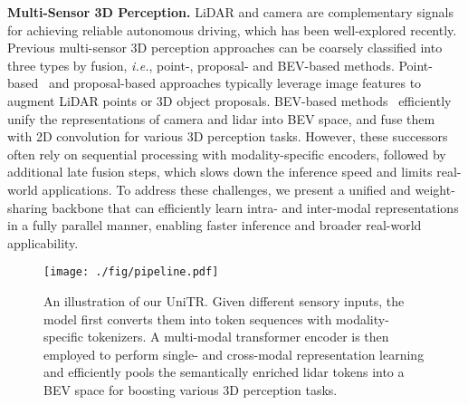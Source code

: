 \documentclass[10pt,twocolumn,letterpaper]{article}
\begin{document}
\noindent \textbf{Multi-Sensor 3D Perception.} LiDAR and camera are complementary signals for achieving reliable autonomous driving, which has been well-explored recently. Previous multi-sensor 3D perception approaches can be coarsely classified into three types by fusion, \emph{i.e.}, point-, proposal- and BEV-based methods. Point-based~\cite{sindagi2019mvx,vora2020pointpainting,huang2020epnet,yin2021cvpr,wang2021pointaugmenting,wu2023virtual} and proposal-based approaches\cite{chen2017multi,yoo20203d,bai2022transfusion,li2022deepfusion,yang2022boosting,wang2023mvcontrast,lu2023cross} typically leverage image features to augment LiDAR points or 3D object proposals. BEV-based methods~\cite{liu2022bevfusion,liang2022bevfusion,gao2023sparse} efficiently unify the representations of camera and lidar into BEV space, and fuse them with 2D convolution for various 3D perception tasks. However, these successors often rely on sequential processing with modality-specific encoders, followed by additional late fusion steps,  which slows down the inference speed and limits real-world applications. To address these challenges, we present a unified and weight-sharing backbone that can efficiently learn intra- and inter-modal representations in a fully parallel manner, enabling faster inference and broader real-world applicability.

\begin{figure*}[t]
\begin{center}
\vspace{-10pt}
\texttt{[image: ./fig/pipeline.pdf]}
\end{center}
   \vspace{-12pt}
   \caption{An illustration of our UniTR. Given different sensory inputs, the model first converts them into token sequences with modality-specific tokenizers. A multi-modal transformer encoder is then employed to perform single- and cross-modal representation learning and efficiently pools the semantically enriched lidar tokens into a BEV space for boosting various 3D perception tasks.}
\label{fig:overview}
\vspace{-12pt}
\end{figure*}
\end{document}
